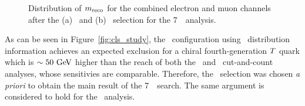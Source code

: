 \begin{figure}[htb]\begin{center}
	\caption[bla]{Distribution of $m_{\rm reco}$  for the combined electron and muon channels after the (a) \loose\ and (b) \tight\ selection for the 7~\tev\ analysis.%
        \label{fig:mrecoBIS}}
\end{center}\end{figure}

As can be seen in Figure~\ref{fig:cls_study}, the \tight\ configuration using 
\mreco\ distribution information achieves an expected
exclusion for a chiral fourth-generation $\T$ quark which is $\sim 50\gev$ 
higher than the reach of both the
\loose\ and \tight\ cut-and-count analyses, whose sensitivies are comparable.
Therefore, the \tight\ selection was chosen 
{\it a priori} to obtain the main result of the 7~\tev\ search.
The same argument is considered to hold for the \wbx\ analysis.

